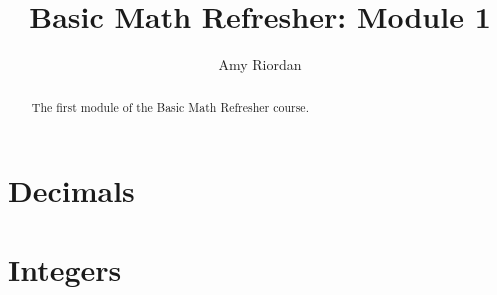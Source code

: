 \documentclass{xourse}
\title{Basic Math Refresher: Module 1}
\author{Amy Riordan}
\begin{document}
\begin{abstract}
    The first module of the Basic Math Refresher course.
\end{abstract}
\maketitle

\part{Decimals}


\part{Integers}
\end{document}
